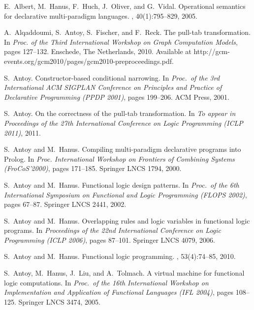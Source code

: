 \documentclass{llncs}
\begin{document}
\begin{thebibliography}{10}

E.~Albert, M.~Hanus, F.~Huch, J.~Oliver, and G.~Vidal.
\newblock Operational semantics for declarative multi-paradigm languages.
, 40(1):795--829, 2005.

A.~Alqaddoumi, S.~Antoy, S.~Fischer, and F.~Reck.
\newblock The pull-tab transformation.
\newblock In {\em Proc. of the Third International Workshop on Graph
  Computation Models}, pages 127--132. Enschede, The Netherlands, 2010.
\newblock Available at
  http://gcm-events.org/gcm2010/pages/gcm2010-preproceedings.pdf.

S.~Antoy.
\newblock Constructor-based conditional narrowing.
\newblock In {\em Proc.\ of the 3rd International ACM SIGPLAN Conference on
  Principles and Practice of Declarative Programming (PPDP 2001)}, pages
  199--206. ACM Press, 2001.

S.~Antoy.
\newblock On the correctness of the pull-tab transformation.
\newblock In {\em To appear in Proceedings of the 27th International Conference
  on Logic Programming (ICLP 2011)}, 2011.

S.~Antoy and M.~Hanus.
\newblock Compiling multi-paradigm declarative programs into {Prolog}.
\newblock In {\em Proc. International Workshop on Frontiers of Combining
  Systems (FroCoS'2000)}, pages 171--185. Springer LNCS 1794, 2000.

S.~Antoy and M.~Hanus.
\newblock Functional logic design patterns.
\newblock In {\em Proc.\ of the 6th International Symposium on Functional and
  Logic Programming (FLOPS 2002)}, pages 67--87. Springer LNCS 2441, 2002.

S.~Antoy and M.~Hanus.
\newblock Overlapping rules and logic variables in functional logic programs.
\newblock In {\em Proceedings of the 22nd International Conference on Logic
  Programming (ICLP 2006)}, pages 87--101. Springer LNCS 4079, 2006.

S.~Antoy and M.~Hanus.
\newblock Functional logic programming.
, 53(4):74--85, 2010.

S.~Antoy, M.~Hanus, J.~Liu, and A.~Tolmach.
\newblock A virtual machine for functional logic computations.
\newblock In {\em Proc.\ of the 16th International Workshop on Implementation
  and Application of Functional Languages (IFL 2004)}, pages 108--125. Springer
  LNCS 3474, 2005.


\end{thebibliography}
\end{document}
